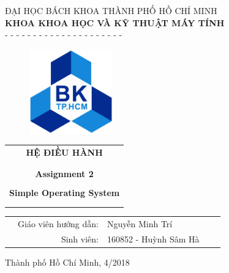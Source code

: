 \begin{titlepage}
\vspace{1.5cm}
\begin{center} \large
ĐẠI HỌC BÁCH KHOA THÀNH PHỐ HỒ CHÍ MINH \\
\textbf{KHOA KHOA HỌC VÀ KỸ THUẬT MÁY TÍNH} \\
- - - - - - - - - - - - - - - - - - - - - 
\end{center}


\vspace{1cm}
\begin{figure}[h!]
\begin{center}
\includegraphics[width=3.6cm]{Images/LogoBK}
\end{center}
\end{figure}
\vspace{1cm}



\begin{center}
\begin{tabular}{c}
\multicolumn{1}{c}{\textbf{{\Huge HỆ ĐIỀU HÀNH}}}\\
\\ \hline \\
\textbf{{\Large Assignment 2}}\\
\\
\textbf{{\huge Simple Operating System}}\\
\\ \hline \\
\end{tabular}
\end{center}



\begin{table}[h]
\begin{tabular}{rrlrr}
\hspace{5cm} 
& {\large Giáo viên hướng dẫn}: & {\large Nguyễn Minh Trí} & & \\ 
& {\large Sinh viên}: & {\large 160852 - Huỳnh Sâm Hà} \\
\end{tabular}
\end{table}

\vspace{3cm}

\begin{center}
{\footnotesize Thành phố Hồ Chí Minh, 4/2018}
\end{center}

\end{titlepage}
